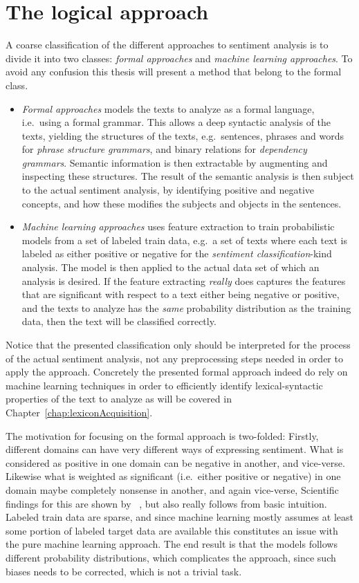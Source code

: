 \section{The logical approach}
\label{sec:logicalApproach}
A coarse classification of the different approaches to sentiment analysis is to divide it into two classes: \emph{formal approaches} and \emph{machine learning approaches}. To avoid any confusion this thesis will present a method that belong to the formal class. 
\begin{itemize}
	\item \textit{Formal approaches} models the texts to analyze as a formal language, i.e.\ using a formal grammar. This allows a deep syntactic analysis of the texts, yielding the structures of the texts, e.g.\ sentences, phrases and words for \emph{phrase structure grammars}, and binary relations for \emph{dependency grammars}. Semantic information is then extractable by augmenting and inspecting these structures. The result of the semantic analysis is then subject to the actual sentiment analysis, by identifying positive and negative concepts, and how these modifies the subjects and objects in the sentences.

	\item \textit{Machine learning approaches} uses feature extraction to train probabilistic models from a set of labeled train data, e.g.\ a set of texts where each text is labeled as either positive or negative for the \emph{sentiment classification}-kind analysis. The model is then applied to the actual data set of which an analysis is desired. If the feature extracting \emph{really} does captures the features that are significant with respect to a text either being negative or positive, and the texts to analyze has the \emph{same} probability distribution as the training data, then the text will be classified correctly.
\end{itemize}

Notice that the presented classification only should be interpreted for the process of the actual sentiment analysis, not any preprocessing steps needed in order to apply the approach. Concretely the presented formal approach indeed do rely on machine learning techniques in order to efficiently identify lexical-syntactic properties of the text to analyze as will be covered in Chapter~\ref{chap:lexiconAcquisition}.

The motivation for focusing on the formal approach is two-folded: Firstly, different domains can have very different ways of expressing sentiment. What is considered as positive in one domain can be negative in another, and vice-verse. Likewise what is weighted as significant (i.e.\ either positive or negative) in one domain maybe completely nonsense in another, and again vice-verse, Scientific findings for this are shown by \citeauthor{domain}~, but also really follows from basic intuition. Labeled train data are sparse, and since machine learning mostly assumes at least some portion of labeled target data are available this constitutes an issue with the pure machine learning approach. The end result is that the models follows different probability distributions, which complicates the approach, since such biases needs to be corrected, which is not a trivial task.


